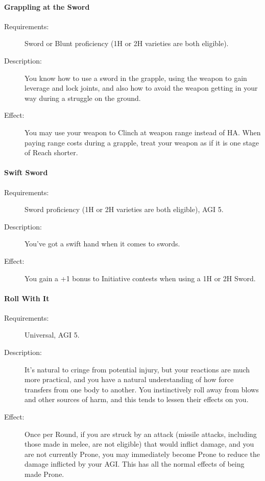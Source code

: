 \documentclass[oneside,11pt,english]{book}
\begin{document}
\paragraph{\label{talent:Grappling at the Sword}Grappling at the Sword}
\begin{description}
\item [Requirements:] Sword or Blunt proficiency (1H or 2H varieties are both eligible). 
\item [Description:] You know how to use a sword in the grapple, using the
  weapon to gain leverage and lock joints, and also how to avoid the weapon
  getting in your way during a struggle on the ground.  
\item [Effect:] You may use your weapon to Clinch at weapon range instead of
  HA. When paying range costs during a grapple, treat your weapon as if it is
  one stage of Reach shorter. 
\end{description}

\paragraph{Swift Sword}\label{talent:Swift Sword}
\begin{description}
\item [Requirements:] Sword proficiency (1H or 2H varieties are both eligible), AGI 5. 
\item [Description:] You’ve got a swift hand when it comes to swords. 
\item [Effect:] You gain a +1 bonus to Initiative contests when using a 1H or 2H Sword. 
  
\end{description}
\paragraph{Roll With It}\label{talent:Roll With It}
\begin{description}
\item [Requirements:] Universal, AGI 5. 
\item [Description:] It's natural to cringe from potential injury, but your reactions are much more practical, and you have a natural understanding of how force transfers from one body to another. You instinctively roll 
  away from blows and other sources of harm, and this tends to lessen their effects on you. 
\item [Effect:] Once per Round, if you are struck by an attack (missile attacks, including those made in melee, 
  are not eligible) that would inflict damage, and you are not currently Prone, you may immediately become 
  Prone to reduce the damage inflicted by your AGI. This has all the normal effects of being made Prone. 
  
\end{description}
\end{document}

